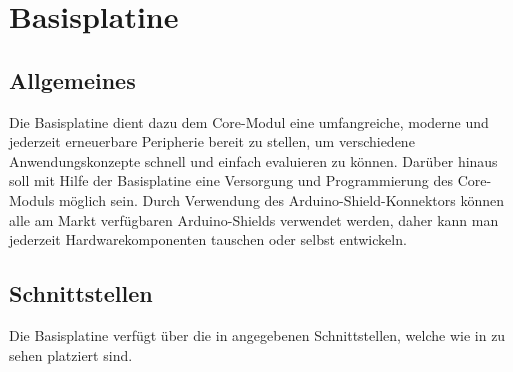 \section{Basisplatine}
\label{sec:basisplatine}


\subsection{Allgemeines}
\label{sec:basisplatine-allgemeines}
Die \gls{Basisplatine} dient dazu dem \gls{Core-Modul} eine umfangreiche, moderne und jederzeit erneuerbare Peripherie bereit zu stellen, um verschiedene Anwendungskonzepte schnell und einfach evaluieren zu können. Darüber hinaus soll mit Hilfe der \gls{Basisplatine} eine Versorgung und Programmierung des \gls{Core-Modul}s möglich sein. Durch Verwendung des Arduino-Shield-Konnektors können alle am Markt verfügbaren Arduino-Shields verwendet werden, daher kann man jederzeit Hardwarekomponenten tauschen oder selbst entwickeln.

\subsection{Schnittstellen}
\label{sec:basisplatine-schnittstellen}

Die \gls{Basisplatine} verfügt über die in  angegebenen Schnittstellen, welche wie in  zu sehen platziert sind.

